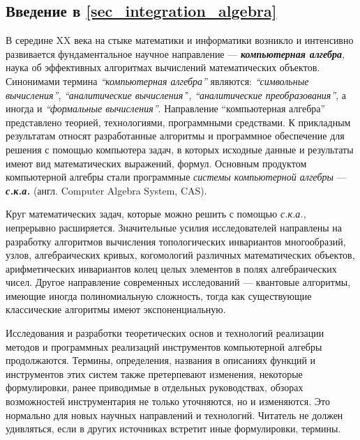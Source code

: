 \subsection*{Введение в \ref{sec_integration_algebra}}

В середине XX века на стыке математики и информатики возникло и интенсивно развивается фундаментальное научное направление --- \textbf{\textit{компьютерная алгебра}}, наука об эффективных алгоритмах вычислений математических объектов. Синонимами термина \textit{``компьютерная алгебра''} являются: \textit{``символьные вычисления''}, \textit{``аналитические вычисления'}', \textit{``аналитические преобразования''}, а иногда и \textit{``формальные вычисления''}. Направление ``компьютерная алгебра'' представлено теорией, технологиями, программными средствами. К прикладным результатам относят разработанные алгоритмы и программное обеспечение для решения с помощью компьютера задач, в которых исходные данные и результаты имеют вид математических выражений, формул. Основным продуктом компьютерной алгебры стали программные \textit{системы компьютерной алгебры} --- \textbf{\textit{с.к.а.}} (англ. Computer Algebra System, CAS). 

Круг математических задач, которые можно решить с помощью \textit{с.к.а.}, непрерывно расширяется. Значительные усилия исследователей направлены на разработку алгоритмов вычисления топологических инвариантов многообразий, узлов, алгебраических кривых, когомологий различных математических объектов, арифметических инвариантов колец целых элементов в полях алгебраических чисел. Другое направление современных исследований --- квантовые алгоритмы, имеющие иногда полиномиальную сложность, тогда как существующие классические алгоритмы имеют экспоненциальную.

Исследования и разработки теоретических основ и технологий реализации методов и программных реализаций инструментов компьютерной алгебры продолжаются. Термины, определения, названия в описаниях функций и инструментов этих систем также претерпевают изменения, некоторые формулировки, ранее приводимые в отдельных руководствах, обзорах возможностей инструментария не только уточняются, но и изменяются. Это нормально для новых научных направлений и технологий. Читатель не должен удивляться, если в других источниках встретит иные формулировки, термины.

